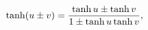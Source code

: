 \[\mathop{\tanh\/}\nolimits\!\left(u\pm v\right)=\frac{\mathop{\tanh\/}\nolimits
u%
\pm\mathop{\tanh\/}\nolimits v}{1\pm\mathop{\tanh\/}\nolimits u\mathop{\tanh\/%
}\nolimits v},\]
